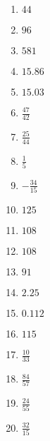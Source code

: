 \documentclass[10pt]{exam}
\begin{document}
\newpage

\begin{multicols*}{2}
\begin{enumerate}
\item \(44\)
\item \(96\)
\item \( 581 \)
\item \( 15.86 \)
\item \( 15.03 \)
\item \(\displaystyle \frac{47}{42} \)
\item \(\displaystyle \frac{25}{44} \)
\item \(\displaystyle \frac{1}{5} \)
\item \(\displaystyle -\frac{34}{15} \)
\item \( 125 \)
\item \( 108 \)
\item \( 108 \)
\item \( 91 \)
\item \( 2.25 \)
\item \( 0.112 \)
\item \( 115 \)
\item \(\displaystyle \frac{10}{33} \)
\item \(\displaystyle \frac{84}{57} \)
\item \(\displaystyle \frac{24}{55} \)
\item \(\displaystyle \frac{32}{15} \)

\end{enumerate}
\end{multicols*}
\end{document}
